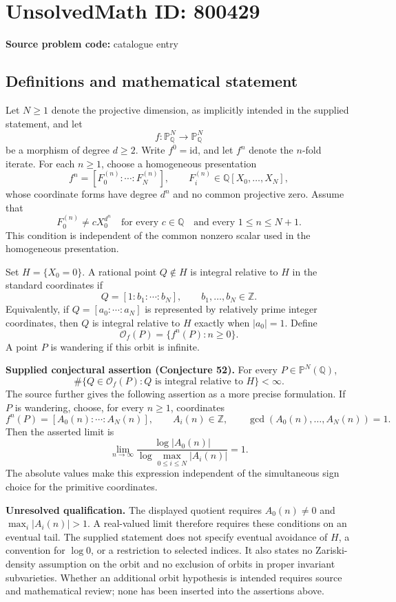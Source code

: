 \documentclass[11pt]{article}
\begin{document}
\section*{UnsolvedMath ID: 800429}
\textbf{Source problem code:} catalogue entry
\subsection{Definitions and mathematical statement}
Let \(N\geq 1\) denote the projective dimension, as implicitly intended in the supplied statement, and let
\[
f:\mathbb{P}^N_{\mathbb{Q}}\longrightarrow\mathbb{P}^N_{\mathbb{Q}}
\]
be a morphism of degree \(d\geq 2\). Write \(f^0=\mathrm{id}\), and let \(f^n\) denote the \(n\)-fold iterate. For each \(n\geq 1\), choose a homogeneous presentation
\[
f^n=[F_0^{(n)}:\cdots:F_N^{(n)}],
\qquad F_i^{(n)}\in\mathbb{Q}[X_0,\ldots,X_N],
\]
whose coordinate forms have degree \(d^n\) and no common projective zero. Assume that
\[
F_0^{(n)}\neq cX_0^{d^n}
\quad\text{for every }c\in\mathbb{Q}
\quad\text{and every }1\leq n\leq N+1.
\]
This condition is independent of the common nonzero scalar used in the homogeneous presentation.

Set \(H=\{X_0=0\}\). A rational point \(Q\notin H\) is integral relative to \(H\) in the standard coordinates if
\[
Q=[1:b_1:\cdots:b_N],\qquad b_1,\ldots,b_N\in\mathbb{Z}.
\]
Equivalently, if \(Q=[a_0:\cdots:a_N]\) is represented by relatively prime integer coordinates, then \(Q\) is integral relative to \(H\) exactly when \(|a_0|=1\). Define
\[
\mathcal{O}_f(P)=\{f^n(P):n\geq 0\}.
\]
A point \(P\) is wandering if this orbit is infinite.

\textbf{Supplied conjectural assertion (Conjecture 52).} For every \(P\in\mathbb{P}^N(\mathbb{Q})\),
\[
\#\bigl\{Q\in\mathcal{O}_f(P):Q\text{ is integral relative to }H\bigr\}<\infty.
\]
The source further gives the following assertion as a more precise formulation. If \(P\) is wandering, choose, for every \(n\geq 1\), coordinates
\[
f^n(P)=[A_0(n):\cdots:A_N(n)],\qquad
A_i(n)\in\mathbb{Z},\qquad
\gcd(A_0(n),\ldots,A_N(n))=1.
\]
Then the asserted limit is
\[
\lim_{n\to\infty}
\frac{\log|A_0(n)|}
{\log\max_{0\leq i\leq N}|A_i(n)|}=1.
\]
The absolute values make this expression independent of the simultaneous sign choice for the primitive coordinates.

\textbf{Unresolved qualification.} The displayed quotient requires \(A_0(n)\neq 0\) and \(\max_i|A_i(n)|>1\). A real-valued limit therefore requires these conditions on an eventual tail. The supplied statement does not specify eventual avoidance of \(H\), a convention for \(\log 0\), or a restriction to selected indices. It also states no Zariski-density assumption on the orbit and no exclusion of orbits in proper invariant subvarieties. Whether an additional orbit hypothesis is intended requires source and mathematical review; none has been inserted into the assertions above.
\end{document}
